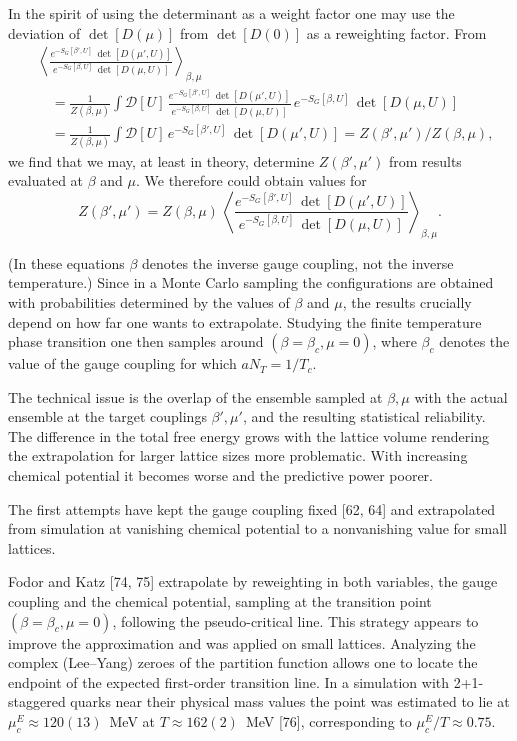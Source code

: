 In the spirit of using the determinant as a weight factor one may use the
deviation of $\det[D(\mu)]$ from $\det[D(0)]$ as a reweighting factor. From
\begin{equation}
\begin{split}
  &\left\langle
    \frac{e^{-S_G[\beta',U]}\,\det[D(\mu',U)]}
         {e^{-S_G[\beta,U]}\,\det[D(\mu,U)]}
  \right\rangle_{\beta,\mu}\\
  &\quad= \frac{1}{Z(\beta,\mu)}\int\mathcal{D}[U]\,
     \frac{e^{-S_G[\beta',U]}\,\det[D(\mu',U)]}
          {e^{-S_G[\beta,U]}\,\det[D(\mu,U)]}\,
     e^{-S_G[\beta,U]}\,\det[D(\mu,U)] \\
  &\quad= \frac{1}{Z(\beta,\mu)}\int\mathcal{D}[U]\,
     e^{-S_G[\beta',U]}\,\det[D(\mu',U)]
  = Z(\beta',\mu')/Z(\beta,\mu),
\end{split}
\end{equation}
we find that we may, at least in theory, determine $Z(\beta',\mu')$ from results
evaluated at $\beta$ and $\mu$. We therefore could obtain values for
\begin{equation}
  Z(\beta',\mu') = Z(\beta,\mu)\,
  \left\langle
    \frac{e^{-S_G[\beta',U]}\,\det[D(\mu',U)]}
         {e^{-S_G[\beta,U]}\,\det[D(\mu,U)]}
  \right\rangle_{\beta,\mu}.
\end{equation}

(In these equations $\beta$ denotes the inverse gauge coupling, not the inverse
temperature.) Since in a Monte Carlo sampling the configurations are obtained
with probabilities determined by the values of $\beta$ and $\mu$, the results
crucially depend on how far one wants to extrapolate. Studying the finite
temperature phase transition one then samples around
$(\beta = \beta_c, \mu = 0)$, where $\beta_c$ denotes the value of the gauge
coupling for which $aN_T = 1/T_c$.

The technical issue is the overlap of the ensemble sampled at $\beta,\mu$ with
the actual ensemble at the target couplings $\beta',\mu'$, and the resulting
statistical reliability. The difference in the total free energy grows with the
lattice volume rendering the extrapolation for larger lattice sizes more
problematic. With increasing chemical potential it becomes worse and the
predictive power poorer.

The first attempts have kept the gauge coupling fixed [62, 64] and extrapolated
from simulation at vanishing chemical potential to a nonvanishing value for
small lattices.

Fodor and Katz [74, 75] extrapolate by reweighting in both variables, the gauge
coupling and the chemical potential, sampling at the transition point
$(\beta = \beta_c, \mu = 0)$, following the pseudo-critical line. This strategy
appears to improve the approximation and was applied on small lattices.
Analyzing the complex (Lee--Yang) zeroes of the partition function allows one
to locate the endpoint of the expected first-order transition line. In a
simulation with 2+1-staggered quarks near their physical mass values the point
was estimated to lie at $\mu_c^E \approx 120(13)$~MeV at $T \approx 162(2)$~MeV
[76], corresponding to $\mu_c^E/T \approx 0.75$.

